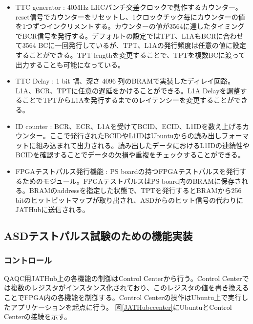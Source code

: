 \begin{itemize}
    \item {TTC generator : } 40MHz LHCバンチ交差クロックで動作するカウンター。reset信号でカウンターをリセットし、1クロックチック毎にカウンターの値を1つずつインクリメントする。カウンターの値が3564に達したタイミングでBCR信号を発行する。デフォルトの設定ではTPT、L1AもBCRに合わせて3564 BCに一回発行しているが、TPT、L1Aの発行頻度は任意の値に設定することができる。TPT lengthを変更することで、TPTを複数BCに渡って出力することも可能になっている。
    \baselineskip

    \item{TTC Delay : }1 bit 幅、深さ 4096 列のBRAMで実装したディレイ回路。L1A、BCR、TPTに任意の遅延をかけることができる。L1A Delayを調整することでTPTからL1Aを発行するまでのレイテンシーを変更することができる。
    \baselineskip

    \item{ID counter : }BCR、ECR、L1Aを受けてBCID、ECID、L1IDを数え上げるカウンター。ここで発行されたBCIDやL1IDはUbuntuからの読み出しフォーマットに組み込まれて出力される。読み出したデータにおけるL1IDの連続性やBCIDを確認することでデータの欠損や重複をチェックすることができる。
    \baselineskip
    
    \item{FPGAテストパルス発行機能 : }PS boardの持つFPGAテストパルスを発行するためのモジュール。FPGAテストパルスはPS board内のBRAMに保存される。BRAMのaddressを指定した状態で、TPTを発行するとBRAMから256 bitのヒットビットマップが取り出され、ASDからのヒット信号の代わりにJATHubに送信される。
    \baselineskip
\end{itemize}

\subsection{ASDテストパルス試験のための機能実装}


\subsubsection{コントロール}
\label{subsubsec_control}
QAQC用JATHub上の各機能の制御はControl Centerから行う。Control Centerでは複数のレジスタがインスタンス化されており、このレジスタの値を書き換えることでFPGA内の各機能を制御する。Control Centerの操作はUbuntu上で実行したアプリケーションを起点に行う。
図\ref{JATHubccenter}にUbuntuとControl Centerの接続を示す。

